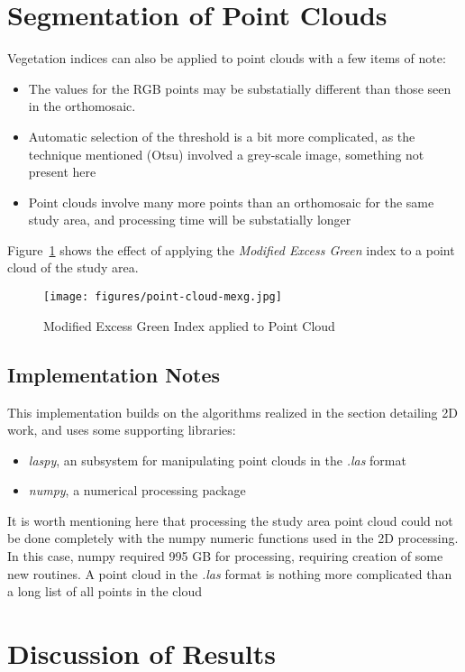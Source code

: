 \documentclass[letterpaper]{article}
\begin{document}
{%
%
\section{Segmentation of Point Clouds}
Vegetation indices can also be applied to point clouds with a few items of note:
\begin{itemize}
\item{The values for the RGB points may be substatially different than those seen in the orthomosaic.}
\item{Automatic selection of the threshold is a bit more complicated, as the technique mentioned (Otsu) involved a grey-scale image, something not present here}
\item{Point clouds involve many more points than an orthomosaic for the same study area, and processing time will be substatially longer}
\end{itemize}
Figure~\ref{fig:point-cloud-mexg} shows the effect of applying the {\it Modified Excess Green} index to a point cloud of the study area.

\begin{figure}[H]
\centering
  	\texttt{[image: figures/point-cloud-mexg.jpg]}
  	 \caption{Modified Excess Green Index applied to Point Cloud}
  	\label{fig:point-cloud-mexg}
\end{figure}

\subsection{Implementation Notes}
This implementation builds on the algorithms realized in the section detailing 2D work, and uses some supporting libraries:
\begin{itemize}
\item{{\it laspy}, an subsystem for manipulating point clouds in the {\it .las} format}
\item{{\it numpy}, a numerical processing package}
\end{itemize}

It is worth mentioning here that processing the study area point cloud could not be done completely with the numpy numeric functions used in the 2D processing. In this case, numpy required 995 GB for processing, requiring creation of some new routines. A point cloud in the {\it .las} format is nothing more complicated than a long list of all points in the cloud
%
%
\section{Discussion of Results}


}
\end{document}

